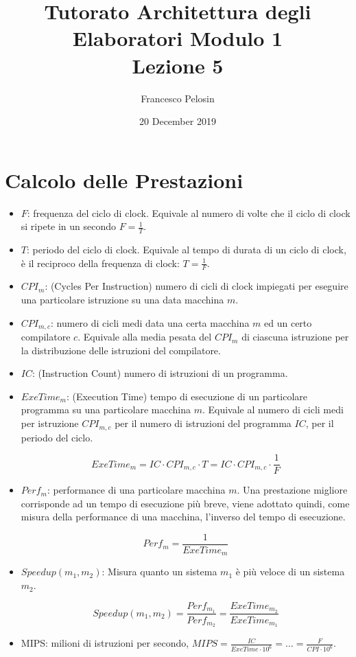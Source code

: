 \documentclass{article}
\title{Tutorato Architettura degli Elaboratori Modulo 1 \\ Lezione 5}
\author{Francesco Pelosin}
\date{20 December 2019}
\begin{document}
\maketitle

\section{Calcolo delle Prestazioni}

\begin{itemize}

     \item $F$: frequenza del ciclo di clock. Equivale al numero di volte che il ciclo di clock si ripete in un secondo $F=\frac{1}{T}$.

     \item $T$: periodo del ciclo di clock. Equivale al tempo di durata di un ciclo di clock, è il reciproco della frequenza di clock: $T = \frac{1}{F}$.

     \item $CPI_{m}$: (Cycles Per Instruction) numero di cicli di clock impiegati per eseguire una particolare istruzione su una data macchina $m$.

     \item $CPI_{m,c}$: numero di cicli medi data una certa macchina $m$ ed un certo compilatore $c$. Equivale alla media pesata del $CPI_{m}$ di ciascuna istruzione per la distribuzione delle istruzioni del compilatore.

     \item $IC$: (Instruction Count) numero di istruzioni di un programma.

     \item $ExeTime_{m}$: (Execution Time) tempo di esecuzione di un particolare programma su una particolare macchina $m$. Equivale al numero di cicli medi per istruzione $CPI_{m,c}$ per il numero di istruzioni del programma $IC$, per il periodo del ciclo.

     $$ ExeTime_{m} = IC \cdot  CPI_{m,c} \cdot  T = IC \cdot  CPI_{m,c} \cdot  \frac{1}{F}$$

     \item $Perf_{m}$: performance di una particolare macchina $m$. Una prestazione migliore corrisponde ad un tempo di esecuzione più breve, viene adottato quindi, come misura della performance di una macchina, l'inverso del tempo di esecuzione.

     $$Perf_{m} = \frac{1}{ExeTime_{m}}$$

     \newpage
     
     \item $Speedup(m_1,m_2)$: Misura quanto un sistema $m_1$ è più veloce di un sistema $m_2$. 
     
     $$Speedup(m_1,m_2) = \frac{Perf_{m_1}}{Perf_{m_2}} = \frac{ExeTime_{m_2}}{ExeTime_{m_1}}$$
    
    \item MIPS: milioni di istruzioni per secondo, $MIPS = \frac{IC}{ExeTime \cdot 10^{6}} = \dots = \frac{F}{CPI \cdot 10^6}$. 

\end{itemize}
\end{document}
